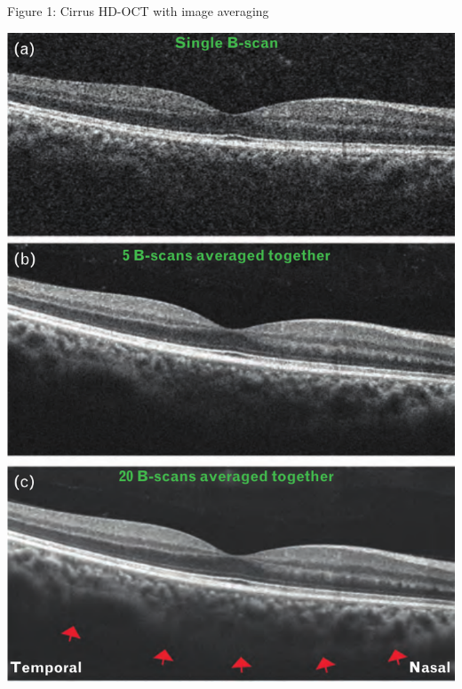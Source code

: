\documentclass{beamer}
\begin{document}
\begin{frame}{Figure 1: Cirrus HD-OCT with image averaging}
    \begin{center}
        \includegraphics[height=0.8\textheight]{1.png}
    \end{center}
\end{frame}
\end{document}
